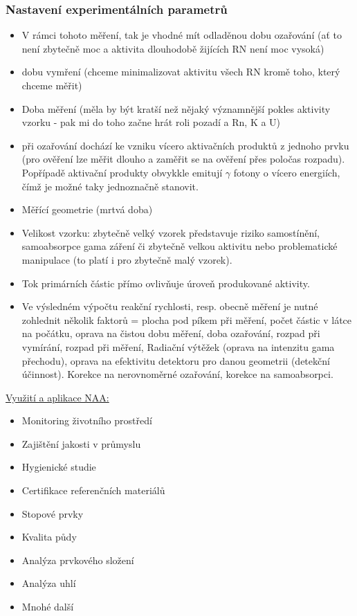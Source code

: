 \subsubsection{Nastavení experimentálních parametrů}
\begin{itemize}

            \item V rámci tohoto měření, tak je vhodné mít odladěnou dobu ozařování (ať to není zbytečně moc a aktivita dlouhodobě žijících RN není moc vysoká)
            \item dobu vymření (chceme minimalizovat aktivitu všech RN kromě toho, který chceme měřit)
            \item Doba měření (měla by být kratší než nějaký významnější pokles aktivity vzorku - pak mi do toho začne hrát roli pozadí a Rn, K a U)
            \item při ozařování dochází ke vzniku vícero aktivačních produktů z jednoho prvku (pro ověření lze měřit dlouho a zaměřit se na ověření přes poločas rozpadu). Popřípadě aktivační produkty obvykkle emitují $\gamma$ fotony o vícero energiích, čímž je možné taky jednoznačně stanovit.
            \item Měřící geometrie (mrtvá doba)
            \item Velikost vzorku: zbytečně velký vzorek představuje riziko samostínění, samoabsorpce gama záření či zbytečně velkou aktivitu nebo problematické manipulace (to platí i pro zbytečně malý vzorek).
            \item Tok primárních částic přímo ovlivňuje úroveň produkované aktivity.
            \item Ve výsledném výpočtu reakční rychlosti, resp. obecně měření je nutné zohlednit několik faktorů = plocha pod píkem při měření, počet částic v látce na počátku, oprava na čistou dobu měření, doba ozařování, rozpad při vymírání, rozpad při měření, Radiační výtěžek (oprava na intenzitu gama přechodu), oprava na efektivitu detektoru pro danou geometrii (detekční účinnost). Korekce na nerovnoměrné ozařování, korekce na samoabsorpci.
        \end{itemize}

\underline{Využití a aplikace NAA:}
\begin{itemize}
    \item Monitoring životního prostředí
    \item Zajištění jakosti v průmyslu
    \item Hygienické studie
    \item Certifikace referenčních materiálů
    \item Stopové prvky
    \item Kvalita půdy
    \item Analýza prvkového složení
    \item Analýza uhlí
    \item Mnohé další
\end{itemize}

